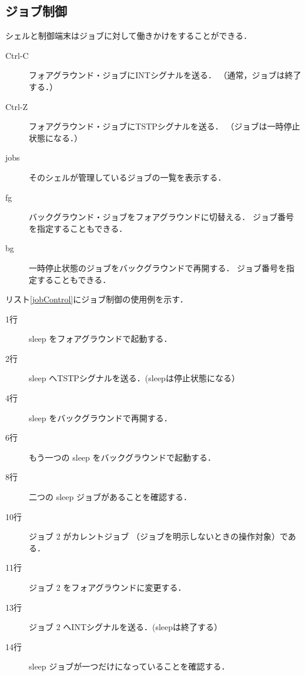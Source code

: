 

\subsection{ジョブ制御}
シェルと制御端末はジョブに対して働きかけをすることができる．

\begin{description}
\item[Ctrl-C] フォアグラウンド・ジョブにINTシグナルを送る．
（通常，ジョブは終了する．）

\item[Ctrl-Z] フォアグラウンド・ジョブにTSTPシグナルを送る．
（ジョブは一時停止状態になる．）

\item[jobs] そのシェルが管理しているジョブの一覧を表示する．

\item[fg] バックグラウンド・ジョブをフォアグラウンドに切替える．
ジョブ番号を指定することもできる．

\item[bg] 一時停止状態のジョブをバックグラウンドで再開する．
ジョブ番号を指定することもできる．
\end{description}

リスト\ref{jobControl}にジョブ制御の使用例を示す．



\begin{description}
\item [1行] sleep をフォアグラウンドで起動する．
\item [2行] sleep へTSTPシグナルを送る．(sleepは停止状態になる）
\item [4行] sleep をバックグラウンドで再開する．
\item [6行] もう一つの sleep をバックグラウンドで起動する．
\item [8行] 二つの sleep ジョブがあることを確認する．
\item [10行] ジョブ 2 がカレントジョブ
（ジョブを明示しないときの操作対象）である．
\item [11行] ジョブ 2 をフォアグラウンドに変更する．
\item [13行] ジョブ 2 へINTシグナルを送る．(sleepは終了する）
\item [14行] sleep ジョブが一つだけになっていることを確認する．
\end{description}

